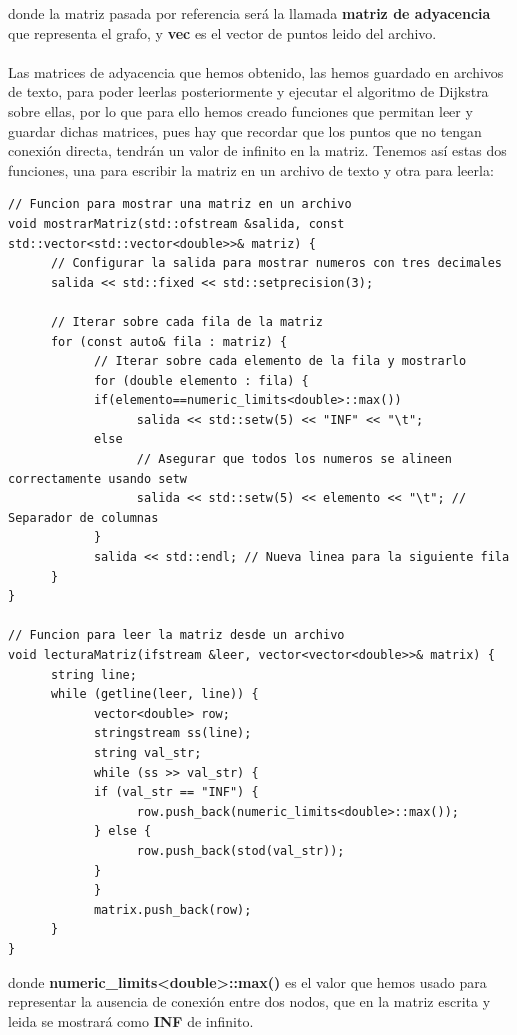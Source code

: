 \documentclass[11pt,openany]{book}
\begin{document}
donde la matriz pasada por referencia será la llamada \textbf{matriz de adyacencia} que representa el grafo, y \textbf{vec} es el vector de puntos
leido del archivo. \\ \\
Las matrices de adyacencia que hemos obtenido, las hemos guardado en archivos de texto, para poder leerlas posteriormente y ejecutar
el algoritmo de Dijkstra sobre ellas, por lo que para ello hemos creado funciones que permitan leer y guardar dichas matrices, pues hay que recordar que 
los puntos que no tengan conexión directa, tendrán un valor de infinito en la matriz. Tenemos así estas dos funciones, una para 
escribir la matriz en un archivo de texto y otra para leerla:
\begin{lstlisting}
// Funcion para mostrar una matriz en un archivo
void mostrarMatriz(std::ofstream &salida, const std::vector<std::vector<double>>& matriz) {
      // Configurar la salida para mostrar numeros con tres decimales
      salida << std::fixed << std::setprecision(3);

      // Iterar sobre cada fila de la matriz
      for (const auto& fila : matriz) {
            // Iterar sobre cada elemento de la fila y mostrarlo
            for (double elemento : fila) {
            if(elemento==numeric_limits<double>::max())
                  salida << std::setw(5) << "INF" << "\t";
            else
                  // Asegurar que todos los numeros se alineen correctamente usando setw
                  salida << std::setw(5) << elemento << "\t"; // Separador de columnas
            }
            salida << std::endl; // Nueva linea para la siguiente fila
      }
}

// Funcion para leer la matriz desde un archivo
void lecturaMatriz(ifstream &leer, vector<vector<double>>& matrix) {
      string line;
      while (getline(leer, line)) {
            vector<double> row;
            stringstream ss(line);
            string val_str;
            while (ss >> val_str) {
            if (val_str == "INF") {
                  row.push_back(numeric_limits<double>::max());
            } else {
                  row.push_back(stod(val_str));
            }
            }
            matrix.push_back(row);
      }
}
\end{lstlisting}
donde \textbf{numeric\_limits<double>::max()} es el valor que hemos usado para representar la ausencia de conexión entre dos nodos, que
en la matriz escrita y leida se mostrará como \textbf{INF} de infinito.\\ \\
\end{document}
